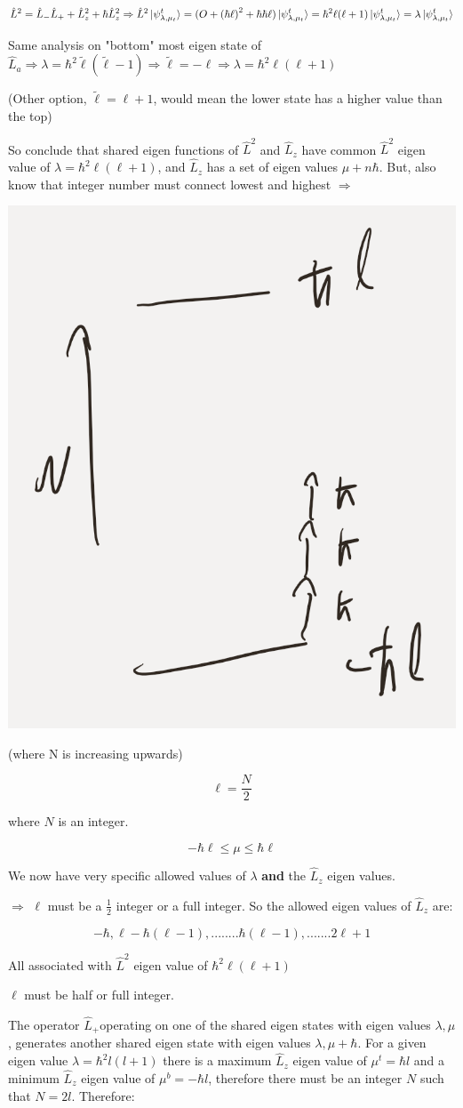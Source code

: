 \documentclass{article}
\begin{document}
$$\hat{L}^2 = \hat{L}_- \hat{L}_+ + \hat{L}_z^2 + \hbar \hat{L}_z^2 \Rightarrow \hat{L}^2 \ket{\psi^t_{\lambda, \mu_t}} = (O + \left( \hbar \ell \right)^2 + \hbar \hbar \ell)\ket{\psi^t_{\lambda, \mu_t}}  = \hbar^2 \ell (\ell + 1)\ket{\psi^t_{\lambda, \mu_t}} = \lambda \ket{\psi^t_{\lambda, \mu_t}}$$

Same analysis on "bottom" most eigen state of $\hat{L}_a \Rightarrow \lambda = \hbar^2 \tilde{\ell}(\tilde{\ell} - 1) \Rightarrow \tilde{\ell} = -\ell \Rightarrow \lambda = \hbar^2 \ell(\ell + 1)$

(Other option, $\tilde{\ell} = \ell + 1$, would mean the lower state has a higher value than the top)

So conclude that shared eigen functions of $\hat{L}^2$ and $\hat{L}_z$ have common $\hat{L}^2$ eigen value of $\lambda = \hbar^2 \ell(\ell + 1)$, and $\hat{L}_z$ has a set of eigen values $\mu + n \hbar$. But, also know that integer number must connect lowest and highest $\Rightarrow$

\includegraphics[width = 0.2 \textwidth]{Lecture22/2.png}

(where N is increasing upwards)



$$\ell = \frac{N}{2}$$

where $N$ is an integer. 

$$- \hbar \ell \leq \mu \leq \hbar \ell$$

We now have very specific allowed values of $\lambda$ \textbf{and} the $\hat{L}_z$ eigen values. 

$\Rightarrow$ $\ell$ must be a $\frac{1}{2}$ integer or a full integer. So the allowed eigen values of $\hat{L}_z$ are:

$$-\hbar, \ell - \hbar(\ell-1),........\hbar(\ell - 1), ....... 2 \ell + 1$$

All associated with $\hat{L}^2$ eigen value of $\hbar^2 \ell(\ell + 1)$

$\ell$ must be half or full integer. 


The operator $\widehat{L}_{+}$operating on one of the shared eigen states with eigen values $\lambda, \mu$, generates another shared eigen state with eigen values $\lambda, \mu+\hbar$. For a given eigen value $\lambda=\hbar^{2} l(l+1)$ there is a maximum $\widehat{L}_{z}$ eigen value of $\mu^{t}=\hbar l$ and a minimum $\hat{L}_{z}$ eigen value of $\mu^{b}=-\hbar l$, therefore there must be an integer $N$ such that $N=2 l$.
Therefore:
\end{document}
